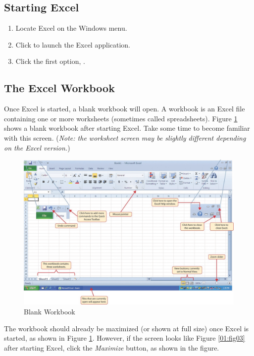 \subsection{Starting Excel}

\begin{enumbox}
	\begin{enumerate}
		\item Locate Excel on the Windows menu.
		\item Click  to launch the Excel application.
		\item Click the first option, .
	\end{enumerate}
\end{enumbox}

\subsection{The Excel Workbook}

Once Excel is started, a blank workbook will open. A workbook is an Excel file containing one or more worksheets (sometimes called spreadsheets). Figure \ref{01:fig02} shows a blank workbook after starting Excel. Take some time to become familiar with this screen. (\textit{Note: the worksheet screen may be slightly different depending on the Excel version.})

\begin{figure}[H]
	\centering
	\includegraphics[width=\maxwidth{.95\linewidth}]{gfx/ch01_fig02}
	\caption{Blank Workbook}
	\label{01:fig02}
\end{figure}

The workbook should already be maximized (or shown at full size) once Excel is started, as shown in Figure \ref{01:fig02}. However, if the screen looks like Figure \ref{01:fig03} after starting Excel, click the \textit{Maximize} button, as shown in the figure.

